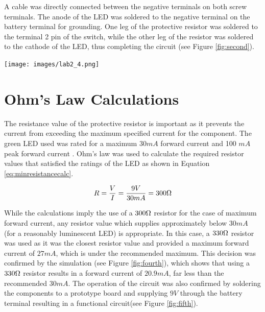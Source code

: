 \documentclass[journal]{IEEEtran}
\begin{document}
\noindent A cable was directly connected between the negative terminals on both screw terminals.  The anode of the LED was soldered to the negative terminal on the battery terminal for grounding. One leg of the protective resistor was soldered to the terminal 2 pin of the switch, while the other leg of the resistor was soldered to the cathode of the LED, thus completing the circuit (see Figure \ref{fig:second}).

\begingroup
    \medskip
    \centering
    \texttt{[image: images/lab2\_4.png]}
    \label{fig:second}
    \medskip
\endgroup


\section{Ohm's Law Calculations}
\noindent The resistance value of the protective resistor is important as it prevents the current from exceeding the maximum specified current for the component. The green LED used was rated for a maximum $30mA$ forward current and 100 $mA$ peak forward current \cite[]{datasheet}. Ohm's law was used to calculate the required resistor values that satisfied the ratings of the LED as shown in Equation \ref{eq:minresistancecalc}.

\begin{equation}
R = \frac{V}{I} = \frac{9V}{30mA} = 300\ohm
\label{eq:minresistancecalc}
\end{equation}

While the calculations imply the use of a $300 \ohm$ resistor for the case of maximum forward current, any resistor value which supplies approximately below $30mA$ (for a reasonably luminescent LED) is appropriate. In this case, a $330 \ohm$ resistor was used as it was the closest resistor value and provided a maximum forward current of $27mA$, which is under the recommended maximum. This decision was confirmed by the simulation (see Figure \ref{fig:fourth}), which shows that using a $330 \ohm$ resistor results in a forward current of $20.9mA$, far less than the recommended $30mA$. The operation of the circuit was also confirmed by soldering the components to a prototype board and supplying $9V$ through the battery terminal resulting in a functional circuit(see Figure \ref{fig:fifth}).
\end{document}
